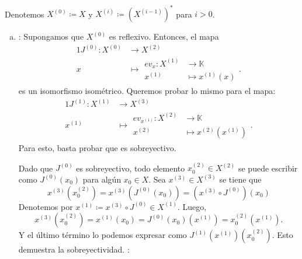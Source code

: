 \documentclass[11pt]{article}
\newenvironment{Solucion}[1][]
{%
  \newline
	\noindent{\ttfamily SOLUCIÓN}~
}%
{%
}
\newcommand{\K}{\mathbb{K}}
\begin{document}
\begin{Solucion}
  Denotemos \(X^{(0)} \coloneqq X\) y \(X^{(i)} \coloneqq (X^{(i-1)})^{\ast}\) para \(i>0\).   
  \begin{enumerate}[(a)]
    \item 
    \framebox{\(\implies\)}: Supongamos que \(X^{(0)}\) es reflexivo. Entonces, el mapa
    \begin{alignat*}{1}
      J^{(0)} \colon X^{(0)} &\to X^{(2)}\\
      x &\mapsto 
      \begin{aligned}
        ev_{x} \colon X^{(1)} &\to \K\\
        x^{(1)} &\mapsto x^{(1)}(x)
      \end{aligned}.
    \end{alignat*}
  es un isomorfismo isométrico. Queremos probar lo mismo para el mapa:
  \begin{alignat*}{1}
    J^{(1)} \colon X^{(1)} &\to X^{(3)}\\
    x^{(1)} &\mapsto
    \begin{aligned}
      ev_{x^{(1)}} \colon X^{(2)} &\to \K\\
      x^{(2)} &\mapsto x^{(2)}(x^{(1)}) 
    \end{aligned}.
  \end{alignat*}
  Para esto, basta probar que es sobreyectivo. 

  Dado que \(J^{(0)}\) es sobreyectivo, todo elemento \(x_0^{(2)} \in X^{(2)}\) se
  puede escribir como \(J^{(0)}(x_0)\) para algún \(x_0 \in X\).
  Sea \(x^{(3)} \in X^{(3)}\) se tiene que 
  \begin{displaymath}
    x^{(3)}(x_0^{(2)})
    = x^{(3)} ( J^{(0)}(x_0) )
    = (x^{(3)}\circ J^{(0)}) (x_0)
  \end{displaymath}
  Denotemos por \(x^{(1)} \coloneqq x^{(3)} \circ J^{(0)} \in X^{(1)}\). Luego,
  \begin{displaymath}
    x^{(3)}(x_0^{(2)}) = x^{(1)}(x_0) = J^{(0)}(x_0)(x^{(1)}) = x_0^{(2)}(x^{(1)}).
  \end{displaymath}
  Y el último término lo podemos expresar como \(J^{(1)}(x^{(1)})(x_0^{(2)})\).
  Esto demuestra la sobreyectividad.
  \framebox{\(\impliedby\)}: 


\end{enumerate}
\end{Solucion}
\end{document}
